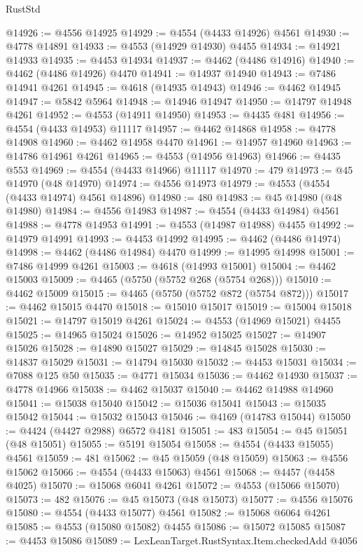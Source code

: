 \begin{lexlean}{RustStd}
\begin{coremodule}
@14926 := @4556 @14925
@14929 := @4554 (@4433 @14926) @4561
@14930 := @4778 @14891
@14933 := @4553 (@14929 @14930) @4455
@14934 := @14921 @14933
@14935 := @4453 @14934
@14937 := @4462 (@4486 @14916)
@14940 := @4462 (@4486 @14926) @4470
@14941 := @14937 @14940
@14943 := @7486 @14941 @4261
@14945 := @4618 (@14935 @14943)
@14946 := @4462 @14945
@14947 := @5842 @5964
@14948 := @14946 @14947
@14950 := @14797 @14948 @4261
@14952 := @4553 (@14911 @14950)
@14953 := @4435 @481
@14956 := @4554 (@4433 @14953) @11117
@14957 := @4462 @14868
@14958 := @4778 @14908
@14960 := @4462 @14958 @4470
@14961 := @14957 @14960
@14963 := @14786 @14961 @4261
@14965 := @4553 (@14956 @14963)
@14966 := @4435 @553
@14969 := @4554 (@4433 @14966) @11117
@14970 := 479
@14973 := @45 @14970 (@48 @14970)
@14974 := @4556 @14973
@14979 := @4553 (@4554 (@4433 @14974) @4561 @14896)
@14980 := 480
@14983 := @45 @14980 (@48 @14980)
@14984 := @4556 @14983
@14987 := @4554 (@4433 @14984) @4561
@14988 := @4778 @14953
@14991 := @4553 (@14987 @14988) @4455
@14992 := @14979 @14991
@14993 := @4453 @14992
@14995 := @4462 (@4486 @14974)
@14998 := @4462 (@4486 @14984) @4470
@14999 := @14995 @14998
@15001 := @7486 @14999 @4261
@15003 := @4618 (@14993 @15001)
@15004 := @4462 @15003
@15009 := @4465 (@5750 (@5752 @268 (@5754 @268)))
@15010 := @4462 @15009
@15015 := @4465 (@5750 (@5752 @872 (@5754 @872)))
@15017 := @4462 @15015 @4470
@15018 := @15010 @15017
@15019 := @15004 @15018
@15021 := @14797 @15019 @4261
@15024 := @4553 (@14969 @15021) @4455
@15025 := @14965 @15024
@15026 := @14952 @15025
@15027 := @14907 @15026
@15028 := @14890 @15027
@15029 := @14845 @15028
@15030 := @14837 @15029
@15031 := @14794 @15030
@15032 := @4453 @15031
@15034 := @7088 @125 @50
@15035 := @4771 @15034
@15036 := @4462 @14930
@15037 := @4778 @14966
@15038 := @4462 @15037
@15040 := @4462 @14988 @14960
@15041 := @15038 @15040
@15042 := @15036 @15041
@15043 := @15035 @15042
@15044 := @15032 @15043
@15046 := @4169 (@14783 @15044)
@15050 := @4424 (@4427 @2988) @6572 @4181
@15051 := 483
@15054 := @45 @15051 (@48 @15051)
@15055 := @5191 @15054
@15058 := @4554 (@4433 @15055) @4561
@15059 := 481
@15062 := @45 @15059 (@48 @15059)
@15063 := @4556 @15062
@15066 := @4554 (@4433 @15063) @4561
@15068 := @4457 (@4458 @4025)
@15070 := @15068 @6041 @4261
@15072 := @4553 (@15066 @15070)
@15073 := 482
@15076 := @45 @15073 (@48 @15073)
@15077 := @4556 @15076
@15080 := @4554 (@4433 @15077) @4561
@15082 := @15068 @6064 @4261
@15085 := @4553 (@15080 @15082) @4455
@15086 := @15072 @15085
@15087 := @4453 @15086
@15089 := LexLeanTarget.RustSyntax.Item.checkedAdd @4056

\end{coremodule}
\end{lexlean}
